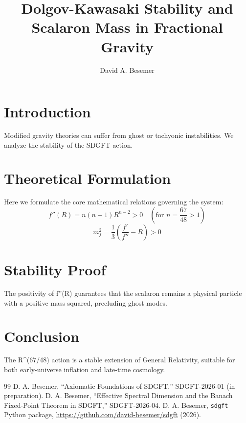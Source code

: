 \documentclass[a4paper,11pt]{article}
\begin{document}
\title{Dolgov-Kawasaki Stability and Scalaron Mass in Fractional Gravity}

\author{David A. Besemer}



\maketitle

\section{Introduction}
Modified gravity theories can suffer from ghost or tachyonic instabilities. We analyze the stability of the SDGFT action.

\section{Theoretical Formulation}
Here we formulate the core mathematical relations governing the system:
\begin{equation}
  f''(R) = n(n-1)R^{n-2} > 0 \quad (\text{for } n = \frac{67}{48} > 1)
\end{equation}
\begin{equation}
  m_f^2 = \frac{1}{3}\left(\frac{f'}{f''} - R\right) > 0
\end{equation}
\section{Stability Proof}
The positivity of f''(R) guarantees that the scalaron remains a physical particle with a positive mass squared, precluding ghost modes.

\section{Conclusion}
The R^(67/48) action is a stable extension of General Relativity, suitable for both early-universe inflation and late-time cosmology.



\begin{thebibliography}{99}
 D. A. Besemer, ``Axiomatic Foundations of SDGFT,'' SDGFT-2026-01 (in preparation).
 D. A. Besemer, ``Effective Spectral Dimension and the Banach Fixed-Point Theorem in SDGFT,'' SDGFT-2026-04.
 D. A. Besemer, \texttt{sdgft} Python package, \url{https://github.com/david-besemer/sdgft} (2026).
\end{thebibliography}
\end{document}
